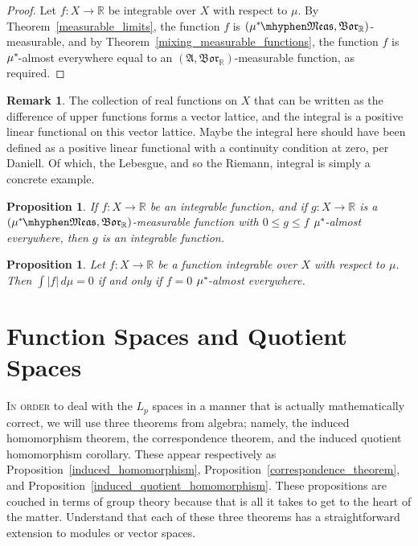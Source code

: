 \documentclass[
twoside=true,
paper=letter,
fontsize=9pt,
pagesize=auto,
leqno,
openany,
headsepline,
overfullrule,
]{scrbook}
\theoremstyle{plain}
\theoremstyle{plain}
\newtheorem{prop}[thm]{Proposition}
\theoremstyle{definition}
\newtheorem{rmk}[thm]{Remark}
\theoremstyle{bfnoteitalic}
\theoremstyle{bfnoteroman}
\newcommand{\sigalg}[1]{\mathfrak{#1}}
\newcommand{\borel}{\mathfrak{Bor}}
\newcommand{\abs}[1]{\left\vert#1\right\vert}
\newcommand{\R}{\mathbb{R}}
\newcommand{\sigmaalgebra}{\sigalg{A}}
\newcommand{\measurable}[1]{{#1}\mhyphen\mathfrak{Meas}}
\newcommand{\kernast}{\ast\kern-1pt}
\newcommand{\funcf}{f}
\newcommand{\function}{f}
\newcommand{\functionii}{g}
\newcommand{\measurespace}{X}
\newcommand{\measure}{\mu}
\begin{document}
\begin{proof}
Let
$f:\measurespace\to\R$ be integrable over $\measurespace$ with respect to $\measure$.
By Theorem~\ref{measurable_limits},  the function $\funcf$ is
$(\measurable{\measure^\kernast}, \borel_\R)$\hyp{}measurable, and
by Theorem~\ref{mixing_measurable_functions}, the function $\funcf$ is $\measure^\kernast$\hyp{}almost everywhere equal to an $(\sigmaalgebra,\borel_\R)$\hyp{}measurable function, as required.
\end{proof}


\begin{rmk}
The collection of real functions on $\measurespace$ that can be written as the difference of upper functions forms a vector lattice, and the integral is a positive linear functional on this vector lattice. Maybe the integral here should have been defined as a positive linear functional with a continuity condition at zero, per Daniell. Of which, the Lebesgue, and so the Riemann, integral is simply a concrete example.
\end{rmk}



\begin{prop}\label{dominated_by_integrable}
If $\function:\measurespace \to \R$ be an integrable function,
and if $\functionii:\measurespace \to \R$ is a $(\measurable{\measure^\kernast},\borel_\R)$\hyp{}measurable function with
$0\leq \functionii \leq \function$ $\measure^\kernast$-almost everywhere, then $\functionii$ is an integrable function.
\end{prop}



\begin{prop}\label{integral_absolute_zero}
Let $f:\measurespace\to\R$ be a function integrable over $\measurespace$ with respect to $\measure$.  
Then $\int \abs{f} \,d\measure = 0$ if and only if $f=0$ $\measure^\kernast$-almost everywhere.
\end{prop}



\chapter{Function Spaces and Quotient Spaces}
\lettrine{I}{n order} to deal with the $L_p$ spaces in a manner that is actually mathematically correct, 
we will use three theorems from algebra; namely, 
the induced homomorphism theorem, the correspondence theorem, and the induced quotient homomorphism corollary. These appear respectively as Proposition~\ref{induced_homomorphism}, Proposition~\ref{correspondence_theorem}, and Proposition~\ref{induced_quotient_homomorphism}. These propositions are couched in terms of group theory because that is all it takes to get to the heart of the matter. Understand that each of these three theorems has a straightforward extension to modules or vector spaces.
\end{document}
